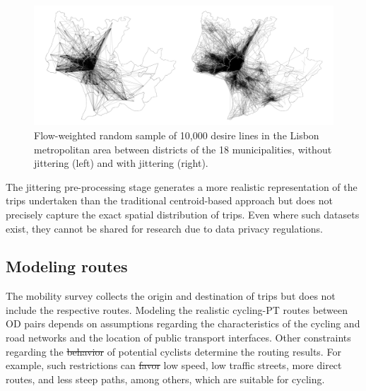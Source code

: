 \documentclass[review, doubleblind, 3p,
authoryear]{elsarticle} %
\providecommand{\DIFaddtex}[1]{{\protect\color{blue}\uwave{#1}}} %
\providecommand{\DIFdeltex}[1]{{\protect\color{red}\sout{#1}}}                      %
\providecommand{\DIFaddbegin}{} %
\providecommand{\DIFaddend}{} %
\providecommand{\DIFdelbegin}{} %
\providecommand{\DIFdelend}{} %
\providecommand{\DIFadd}[1]{\texorpdfstring{\DIFaddtex{#1}}{#1}} %
\providecommand{\DIFdel}[1]{\texorpdfstring{\DIFdeltex{#1}}{}} %
\newcommand{\DIFscaledelfig}{0.5}
\newlength{\DIFdelgraphicswidth} %
\newlength{\DIFdelgraphicsheight} %
\newcommand{\DIFaddincludegraphics}[2][]{{\color{blue}\fbox{\DIFOincludegraphics[#1]{#2}}}} %
\newcommand{\DIFdelincludegraphics}[2][]{%
\sbox{\DIFdelgraphicsbox}{\DIFOincludegraphics[#1]{#2}}%
\settoboxwidth{\DIFdelgraphicswidth}{\DIFdelgraphicsbox} %
\settoboxtotalheight{\DIFdelgraphicsheight}{\DIFdelgraphicsbox} %
\scalebox{\DIFscaledelfig}{%
\parbox[b]{\DIFdelgraphicswidth}{\usebox{\DIFdelgraphicsbox}\\[-\baselineskip] \rule{\DIFdelgraphicswidth}{0em}}\llap{\resizebox{\DIFdelgraphicswidth}{\DIFdelgraphicsheight}{%
\setlength{\unitlength}{\DIFdelgraphicswidth}%
\begin{picture}(1,1)%
\thicklines\linethickness{2pt} %
{\color[rgb]{1,0,0}\put(0,0){\framebox(1,1){}}}%
{\color[rgb]{1,0,0}\put(0,0){\line( 1,1){1}}}%
{\color[rgb]{1,0,0}\put(0,1){\line(1,-1){1}}}%
\end{picture}%
}\hspace*{3pt}}} %
} %
\DeclareRobustCommand{\DIFaddbegin}{\DIFOaddbegin \let\includegraphics\DIFaddincludegraphics} %
\DeclareRobustCommand{\DIFaddend}{\DIFOaddend \let\includegraphics\DIFOincludegraphics} %
\DeclareRobustCommand{\DIFdelbegin}{\DIFOdelbegin \let\includegraphics\DIFdelincludegraphics} %
\DeclareRobustCommand{\DIFdelend}{\DIFOaddend \let\includegraphics\DIFOincludegraphics} %
\begin{document}
\begin{figure}

{\centering \includegraphics[width=1\linewidth,]{img/jitter_cairo} 

}

\caption{Flow-weighted random sample of 10,000 desire lines in the Lisbon metropolitan area between districts of the 18 municipalities, without jittering (left) and with jittering (right).}\label{fig:jitter}
\end{figure}

The jittering pre-processing stage generates a more realistic
representation of the trips undertaken than the traditional
centroid-based approach but does not precisely capture the exact spatial
distribution of trips. Even where such datasets exist, they cannot be
shared for research due to data privacy regulations.

\subsection{Modeling routes}\label{modeling-routes}

The mobility survey collects the origin and destination of trips but
does not include the respective routes. Modeling the realistic
cycling-PT routes between OD pairs depends on assumptions regarding the
characteristics of the cycling and road networks and the location of
public transport interfaces. Other constraints regarding the \DIFdelbegin \DIFdel{behavior }\DIFdelend \DIFaddbegin \DIFadd{behaviour
}\DIFaddend of potential cyclists determine the routing results. For example, such
restrictions can \DIFdelbegin \DIFdel{favor }\DIFdelend \DIFaddbegin \DIFadd{favour }\DIFaddend low speed, low traffic streets, more direct
routes, and less steep paths, among others, which are suitable for
cycling.
\end{document}
